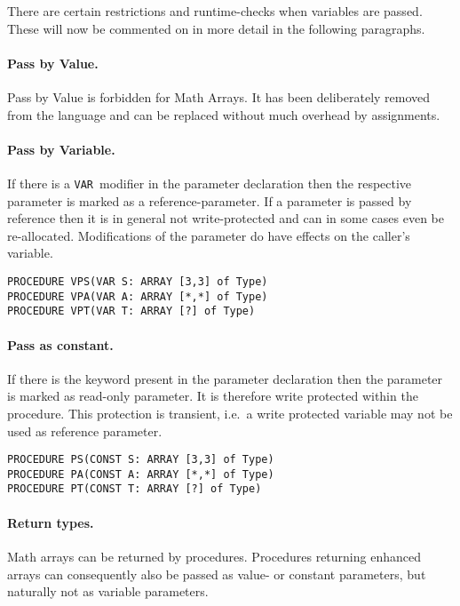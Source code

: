 \documentclass[a4wide,11pt]{article}
\newcommand{\pc}[1]{\makebox{\tt#1}}
\newcommand{\VAR}{\lstinline"VAR"}
\begin{document}
There are certain restrictions and runtime-checks when variables are passed.
These will now be commented on in more detail in the following paragraphs.

\paragraph{Pass by Value.}
Pass by Value is forbidden for Math Arrays.
It has been deliberately removed from the language and can be replaced without much overhead by assignments.

\paragraph{Pass by Variable.} If there is a \VAR\ modifier in the parameter declaration then  the respective parameter is marked as a reference-parameter.
If a parameter is passed by reference then it is in general not write-protected and can in some cases even be re-allocated.
Modifications of the parameter do have effects on the caller's variable.

\begin{lstlisting}[style=example]
PROCEDURE VPS(VAR S: ARRAY [3,3] of Type)
PROCEDURE VPA(VAR A: ARRAY [*,*] of Type)
PROCEDURE VPT(VAR T: ARRAY [?] of Type)
\end{lstlisting}

\paragraph{Pass as constant.} If there is the \pc{const} keyword present in the parameter declaration then the parameter is marked as read-only parameter.
It is therefore write protected within the procedure.
This protection is transient, i.e.\ a write protected variable may not be used as reference parameter.

\begin{lstlisting}[style=example]
PROCEDURE PS(CONST S: ARRAY [3,3] of Type)
PROCEDURE PA(CONST A: ARRAY [*,*] of Type)
PROCEDURE PT(CONST T: ARRAY [?] of Type)
\end{lstlisting}

\paragraph{Return types.} Math arrays can be returned by procedures.
Procedures returning enhanced arrays can consequently also be passed as value- or constant parameters, but naturally not as variable parameters.
\end{document}

